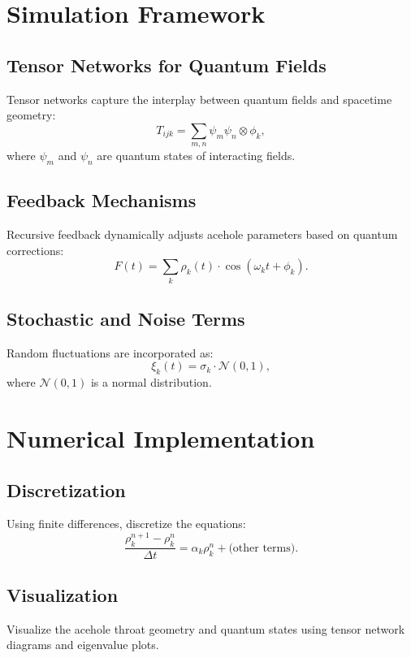 \documentclass{article}
\theoremstyle{plain}
\begin{document}
\section{Simulation Framework}

\subsection{Tensor Networks for Quantum Fields}
Tensor networks capture the interplay between quantum fields and spacetime geometry:
\begin{equation}
    T_{ijk} = \sum_{m,n} \psi_m \psi_n \otimes \phi_k,
\end{equation}
where $\psi_m$ and $\psi_n$ are quantum states of interacting fields.

\subsection{Feedback Mechanisms}
Recursive feedback dynamically adjusts acehole parameters based on quantum corrections:
\begin{equation}
    F(t) = \sum_{k} \rho_k(t) \cdot \cos(\omega_k t + \phi_k).
\end{equation}

\subsection{Stochastic and Noise Terms}
Random fluctuations are incorporated as:
\begin{equation}
    \xi_k(t) = \sigma_k \cdot \mathcal{N}(0,1),
\end{equation}
where $\mathcal{N}(0,1)$ is a normal distribution.

\section{Numerical Implementation}

\subsection{Discretization}
Using finite differences, discretize the equations:
\begin{equation}
    \frac{\rho_k^{n+1} - \rho_k^n}{\Delta t} = \alpha_k \rho_k^n + \text{(other terms)}.
\end{equation}

\subsection{Visualization}
Visualize the acehole throat geometry and quantum states using tensor network diagrams and eigenvalue plots.
\end{document}
